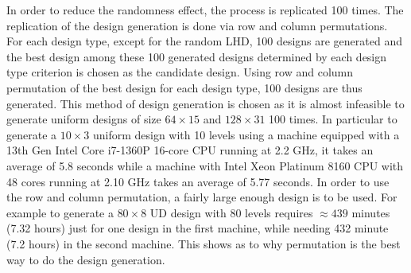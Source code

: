 \documentclass [PhD] {package/uclathes}
\begin{document}
In order to reduce the randomness effect, the process is replicated 100 times. The replication  of the design generation is done via row and column permutations.  For each design type, except for the random LHD, 100 designs are generated and the best design among these 100 generated designs determined by each design type criterion is chosen as the candidate design. Using row and column permutation of the best design for each design type, 100  designs are thus generated. This method of design generation is chosen as it is almost infeasible to generate uniform designs of size $64 \times 15$ and $128\times 31$ 100 times. In particular to generate a $10\times 3$ uniform design with 10 levels using a machine equipped with a 13th Gen Intel Core\texttrademark{} i7-1360P 16-core CPU running at 2.2 GHz, it takes an average of 5.8 seconds while a machine with Intel\textregistered{} Xeon\textregistered{} Platinum 8160 CPU with 48 cores running at 2.10 GHz takes an average of 5.77 seconds. In order to use the row and column permutation, a fairly large enough design is to be used. For example to generate a $80\times 8$ UD design with 80 levels requires $\approx 439$ minutes (7.32 hours) just for one design in the first machine, while needing 432 minute (7.2 hours) in the second machine. This shows as to why permutation is the best way to do the design generation.
\end{document}

